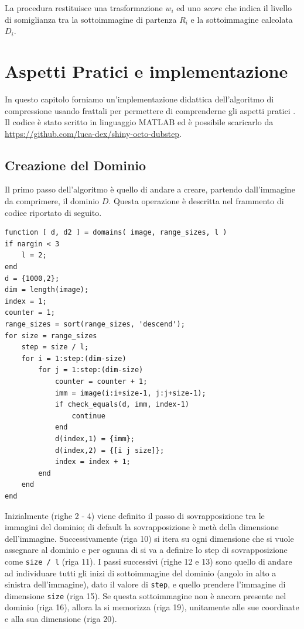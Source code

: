 \documentclass[11pt,a4paper,appendixprefix=true,numbers=noenddot]{scrreprt}
\begin{document}
La procedura  restituisce una trasformazione $w_i$ ed uno $score$ che indica il livello di somiglianza tra la sottoimmagine di partenza $R_i$ e la sottoimmagine calcolata $D_i$.

\chapter{Aspetti Pratici e implementazione}

In questo capitolo forniamo un'implementazione didattica dell'algoritmo di compressione usando frattali per permettere di comprenderne gli aspetti pratici . Il codice è stato scritto in linguaggio MATLAB ed è possibile scaricarlo da \url{https://github.com/luca-dex/shiny-octo-dubstep}.

\section{Creazione del Dominio}

Il primo passo dell'algoritmo è quello di andare a creare, partendo dall'immagine da comprimere, il dominio $D$. Questa operazione è descritta nel frammento di codice riportato di seguito.

\begin{verbatim}
function [ d, d2 ] = domains( image, range_sizes, l )
if nargin < 3
    l = 2;
end
d = {1000,2};
dim = length(image);
index = 1;
counter = 1;
range_sizes = sort(range_sizes, 'descend');
for size = range_sizes
    step = size / l;
    for i = 1:step:(dim-size)
        for j = 1:step:(dim-size)
            counter = counter + 1;
            imm = image(i:i+size-1, j:j+size-1);
            if check_equals(d, imm, index-1)
                continue
            end
            d(index,1) = {imm};
            d(index,2) = {[i j size]};
            index = index + 1;
        end
    end
end
\end{verbatim}

Inizialmente (righe 2 - 4) viene definito il passo di sovrapposizione tra le immagini del dominio; di default la sovrapposizione è metà della dimensione dell'immagine. Successivamente (riga 10) si itera su ogni dimensione che si vuole assegnare al dominio e per ognuna di si va a definire lo step di sovrapposizione come \texttt{size / l} (riga 11). I passi successivi (righe 12 e 13) sono quello di andare ad individuare tutti gli inizi di sottoimmagine del dominio (angolo in alto a sinistra dell'immagine), dato il valore di \texttt{step}, e quello prendere l'immagine di dimensione \texttt{size} (riga 15). Se questa sottoimmagine non è ancora presente nel dominio (riga 16), allora la si memorizza (riga 19), unitamente alle sue coordinate e alla sua dimensione (riga 20).
\end{document}
